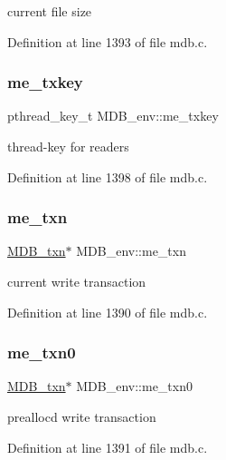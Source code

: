 current file size 

Definition at line 1393 of file mdb.\+c.

\mbox{\label{struct_m_d_b__env_a2f9ec605ad2ed099b970527d9aabb786}} 
\subsubsection{\texorpdfstring{me\+\_\+txkey}{me\_txkey}}
{\footnotesize\ttfamily pthread\+\_\+key\+\_\+t M\+D\+B\+\_\+env\+::me\+\_\+txkey}

thread-\/key for readers 

Definition at line 1398 of file mdb.\+c.

\mbox{\label{struct_m_d_b__env_a41f4abc70ee54d822f4674d48d4c4461}} 
\subsubsection{\texorpdfstring{me\+\_\+txn}{me\_txn}}
{\footnotesize\ttfamily \mbox{\hyperlink{struct_m_d_b__txn}{M\+D\+B\+\_\+txn}}$\ast$ M\+D\+B\+\_\+env\+::me\+\_\+txn}

current write transaction 

Definition at line 1390 of file mdb.\+c.

\mbox{\label{struct_m_d_b__env_a6981326b3defd1cd688922f896a1b279}} 
\subsubsection{\texorpdfstring{me\+\_\+txn0}{me\_txn0}}
{\footnotesize\ttfamily \mbox{\hyperlink{struct_m_d_b__txn}{M\+D\+B\+\_\+txn}}$\ast$ M\+D\+B\+\_\+env\+::me\+\_\+txn0}

prealloc\textquotesingle{}d write transaction 

Definition at line 1391 of file mdb.\+c.

\mbox{\label{struct_m_d_b__env_ae0082e483c3bb1a0d6572d21f7da3010}} 
